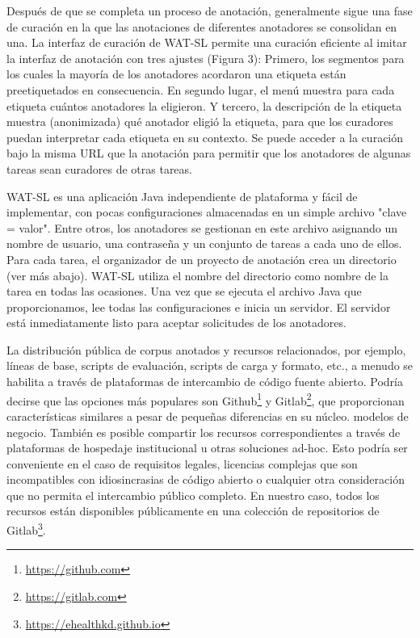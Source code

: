 Después de que se completa un proceso de anotación, generalmente sigue una fase de curación en la que las anotaciones de diferentes anotadores se consolidan en una. La interfaz de curación de WAT-SL permite una curación eficiente al imitar la interfaz de anotación con tres ajustes (Figura 3): Primero, los segmentos para los cuales la mayoría de los anotadores acordaron una etiqueta están preetiquetados en consecuencia. En segundo lugar, el menú muestra para cada etiqueta cuántos anotadores la eligieron. Y tercero, la descripción de la etiqueta muestra (anonimizada) qué anotador eligió la etiqueta, para que los curadores puedan interpretar cada etiqueta en su contexto. Se puede acceder a la curación bajo la misma URL que la anotación para permitir que los anotadores de algunas tareas sean curadores de otras tareas.

WAT-SL es una aplicación Java independiente de plataforma y fácil de implementar, con pocas configuraciones almacenadas en un simple archivo "clave = valor". Entre otros, los anotadores se gestionan en este archivo asignando un nombre de usuario, una contraseña y un conjunto de tareas a cada uno de ellos. Para cada tarea, el organizador de un proyecto de anotación crea un directorio (ver más abajo). WAT-SL utiliza el nombre del directorio como nombre de la tarea en todas las ocasiones. Una vez que se ejecuta el archivo Java que proporcionamos, lee todas las configuraciones e inicia un servidor. El servidor está inmediatamente listo para aceptar solicitudes de los anotadores.

La distribución pública de corpus anotados y recursos relacionados, por ejemplo, líneas de base, scripts de evaluación, scripts de carga y formato, etc., a menudo se habilita a través de plataformas de intercambio de código fuente abierto.
Podría decirse que las opciones más populares son Github\footnote{\url{https://github.com}} y Gitlab\footnote{\url{https://gitlab.com}}, que proporcionan características similares a pesar de pequeñas diferencias en su núcleo. modelos de negocio.
También es posible compartir los recursos correspondientes a través de plataformas de hospedaje institucional u otras soluciones ad-hoc. Esto podría ser conveniente en el caso de requisitos legales, licencias complejas que son incompatibles con idiosincrasias de código abierto o cualquier otra consideración que no permita el intercambio público completo.
En nuestro caso, todos los recursos están disponibles públicamente en una colección de repositorios de Gitlab\footnote{\url{https://ehealthkd.github.io}}.

